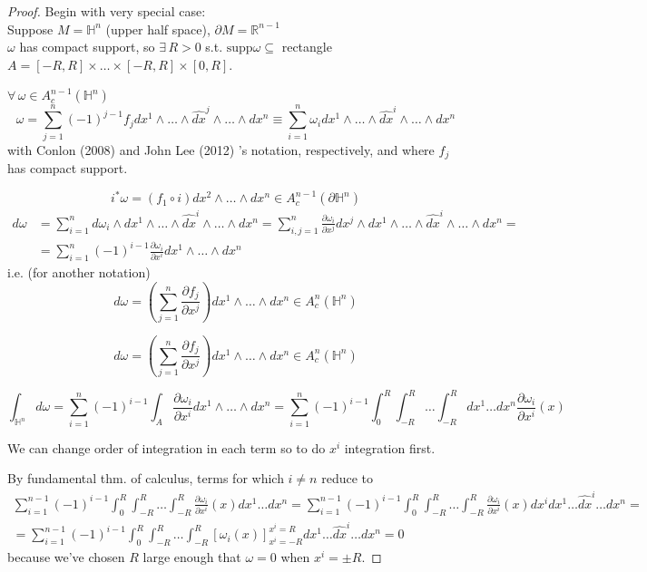 \begin{proof}
Begin with very special case: \\
Suppose $M = \mathbb{H}^n$ (upper half space), $\partial M = \mathbb{R}^{n-1}$ \\
$\omega$ has compact support, so $\exists \, R >0$ s.t. $\text{supp}\omega \subseteq $ rectangle $A=[-R,R] \times \dots \times [-R, R] \times [0,R]$.  

$\forall \, \omega \in A_c^{n-1}(\mathbb{H}^n)$
\begin{equation}
\omega = \sum_{j=1}^n (-1)^{j-1} f_j dx^1 \wedge \dots \wedge \widehat{dx}^j \wedge \dots \wedge dx^n \equiv \sum_{i=1}^n \omega_i dx^1 \wedge \dots \wedge \widehat{dx}^i \wedge \dots \wedge dx^n
\end{equation}
with Conlon (2008) \cite{dgdt:Conl2008} and John Lee (2012) \cite{dgdt:JLee2012}'s notation, respectively, and where $f_j$ has compact support.  

\[
i^*\omega = (f_1 \circ i) dx^2 \wedge \dots \wedge dx^n \in A_c^{n-1}(\partial \mathbb{H}^n)
\]
\[ 
\begin{aligned}
d\omega & = \sum_{i=1}^n d\omega_i \wedge dx^1 \wedge \dots \wedge \widehat{dx}^i \wedge \dots \wedge dx^n = \sum_{i,j=1}^n \frac{\partial \omega_i}{ \partial x^j} dx^j \wedge dx^1 \wedge \dots \wedge \widehat{dx}^i \wedge \dots \wedge dx^n = \\
& = \sum_{i=1}^n (-1)^{i-1} \frac{ \partial \omega_i}{ \partial x^i } dx^1 \wedge \dots \wedge dx^n
\end{aligned}
\]
i.e. (for another notation)
\[
d\omega = \left( \sum_{j=1}^n \frac{\partial f_j}{ \partial x^j} \right) dx^1 \wedge \dots \wedge dx^n \in A_c^n(\mathbb{H}^n)
\]

\[
d\omega = \left( \sum_{j=1}^n \frac{\partial f_j}{ \partial x^j} \right) dx^1 \wedge \dots \wedge dx^n \in A_c^n(\mathbb{H}^n)
\]

\[
\int_{\mathbb{H}^n} d\omega = \sum_{i=1}^n (-1)^{i-1} \int_A \frac{ \partial \omega_i}{ \partial x^i } dx^1 \wedge \dots \wedge dx^n = \sum_{i=1}^n (-1)^{i-1} \int_0^R \int_{-R}^R \dots \int_{-R}^R dx^1 \dots dx^n \frac{ \partial \omega_i}{\partial x^i}(x)
\]

We can change order of integration in each term so to do $x^i$ integration first. 

By fundamental thm. of calculus, terms for which $i\neq n$ reduce to 
\[
\begin{gathered}
\sum_{i=1}^{n-1} (-1)^{i-1} \int_0^R \int_{-R}^R \dots \int_{-R}^R \frac{\partial \omega_i}{\partial x^i}(x) dx^1 \dots dx^n = \sum_{i=1}^{n-1} (-1)^{i-1} \int_0^R \int_{-R}^R \dots \int_{-R}^R \frac{\partial \omega_i}{\partial x^i}(x) dx^i dx^1 \dots \widehat{dx}^i \dots dx^n = \\
= \sum_{i=1}^{n-1} (-1)^{i-1} \int_0^R \int_{-R}^R \dots \int_{-R}^R [\omega_i(x)]_{x^i = -R}^{x^i = R} dx^1 \dots \widehat{dx}^i \dots dx^n = 0 
\end{gathered} 
\]
because we've chosen $R$ large enough that $\omega =0 $ when $x^i = \pm R$.  
	
	
\end{proof}

